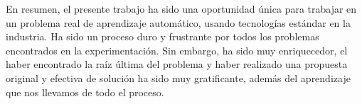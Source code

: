 En resumen, el presente trabajo ha sido una oportunidad única para trabajar en un problema real de aprendizaje automático, usando tecnologías estándar en la industria. Ha sido un proceso duro y frustrante por todos los problemas encontrados en la experimentación. Sin embargo, ha sido muy enriquecedor, el haber encontrado la raíz última del problema y haber realizado una propuesta original y efectiva de solución ha sido muy gratificante, además del aprendizaje que nos llevamos de todo el proceso.
